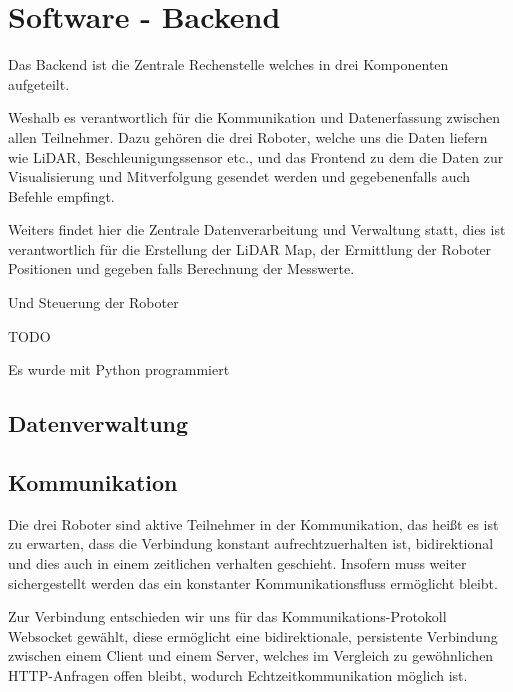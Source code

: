 
\chapter{Software - Backend}
\label{sec:software_backend}
Das Backend ist die Zentrale Rechenstelle welches in drei Komponenten aufgeteilt.

Weshalb es verantwortlich für die Kommunikation und Datenerfassung zwischen allen Teilnehmer. 
Dazu gehören die drei Roboter, welche uns die Daten liefern wie LiDAR, Beschleunigungssensor etc., 
und das Frontend zu dem die Daten zur Visualisierung und Mitverfolgung gesendet werden 
und gegebenenfalls auch Befehle empfingt.

Weiters findet hier die Zentrale Datenverarbeitung und Verwaltung statt, 
dies ist verantwortlich für die Erstellung der LiDAR Map, 
der Ermittlung der Roboter Positionen 
und gegeben falls Berechnung der Messwerte. 

Und Steuerung der Roboter

TODO

Es wurde mit Python programmiert

\section{Datenverwaltung}
\label{subsec:backend_data}


\section{Kommunikation}
\label{subsec:Kommunikation}
Die drei Roboter sind aktive Teilnehmer in der Kommunikation, 
das heißt es ist zu erwarten, dass die Verbindung konstant aufrechtzuerhalten ist,
bidirektional und dies auch in einem zeitlichen verhalten geschieht. 
Insofern muss weiter sichergestellt werden das ein konstanter Kommunikationsfluss ermöglicht bleibt.

Zur Verbindung entschieden wir uns für das Kommunikations-Protokoll Websocket gewählt, 
diese ermöglicht eine bidirektionale, persistente Verbindung zwischen einem Client und einem Server,
welches im Vergleich zu gewöhnlichen HTTP-Anfragen offen bleibt, wodurch Echtzeitkommunikation möglich ist.


